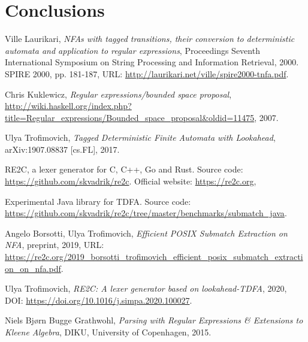 \documentclass[]{article}
\begin{document}
\FloatBarrier

\section{Conclusions}\label{section_conclusions}


\pagebreak

\begin{thebibliography}{99}

    Ville Laurikari,
    \textit{NFAs with tagged transitions, their conversion to deterministic automata and application to regular expressions},
    Proceedings Seventh International Symposium on String Processing and Information Retrieval, 2000. SPIRE 2000,
    pp. 181-187,
    URL: \url{http://laurikari.net/ville/spire2000-tnfa.pdf}.

    Chris Kuklewicz,
    \textit{Regular expressions/bounded space proposal},
    \url{http://wiki.haskell.org/index.php?title=Regular_expressions/Bounded_space_proposal&oldid=11475},
    2007.

    Ulya Trofimovich,
    \textit{Tagged Deterministic Finite Automata with Lookahead},
    arXiv:1907.08837 [cs.FL],
    2017.

    RE2C, a lexer generator for C, C++, Go and Rust.
    Source code: \url{https://github.com/skvadrik/re2c}.
    Official website: \url{https://re2c.org},

    Experimental Java library for TDFA.
    Source code: \url{https://github.com/skvadrik/re2c/tree/master/benchmarks/submatch_java}.

    Angelo Borsotti, Ulya Trofimovich,
    \textit{Efficient POSIX Submatch Extraction on NFA},
    preprint, 2019,
    URL: \url{https://re2c.org/2019_borsotti_trofimovich_efficient_posix_submatch_extraction_on_nfa.pdf}.

    Ulya Trofimovich,
    \textit{RE2C: A lexer generator based on lookahead-TDFA},
    2020,
    DOI: \url{https://doi.org/10.1016/j.simpa.2020.100027}.

    Niels Bj{\o}rn Bugge Grathwohl,
    \textit{Parsing with Regular Expressions \& Extensions to Kleene Algebra},
    DIKU, University of Copenhagen,
    2015.


\end{thebibliography}
\end{document}
